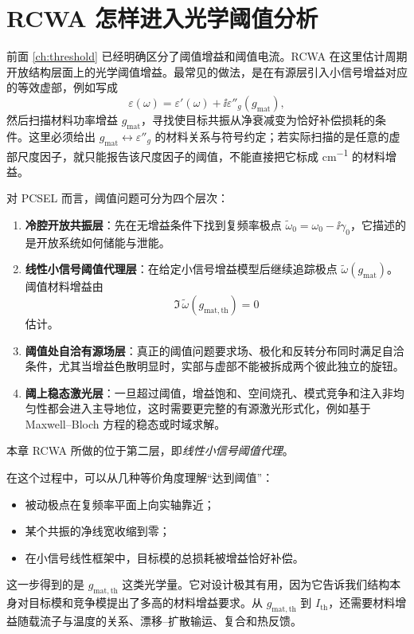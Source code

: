 \section{RCWA 怎样进入光学阈值分析}
前面 \cref{ch:threshold} 已经明确区分了阈值增益和阈值电流。RCWA 在这里估计周期开放结构层面上的光学阈值增益。最常见的做法，是在有源层引入小信号增益对应的等效虚部，例如写成
\begin{equation}
\varepsilon(\omega)
=
\varepsilon'(\omega)+\ii\varepsilon''_g(g_{\mathrm{mat}}),
\label{eq:rcwa_gain_continuation}
\end{equation}
然后扫描材料功率增益 $g_{\mathrm{mat}}$，寻找使目标共振从净衰减变为恰好补偿损耗的条件。这里必须给出 $g_{\mathrm{mat}}\leftrightarrow\varepsilon''_g$ 的材料关系与符号约定；若实际扫描的是任意的虚部尺度因子，就只能报告该尺度因子的阈值，不能直接把它标成 \si{cm^{-1}} 的材料增益。

对 PCSEL 而言，阈值问题可分为四个层次：
\begin{enumerate}
  \item \textbf{冷腔开放共振层}：先在无增益条件下找到复频率极点 $\tilde{\omega}_0=\omega_0-\ii\gamma_0$，它描述的是开放系统如何储能与泄能。
  \item \textbf{线性小信号阈值代理层}：在给定小信号增益模型后继续追踪极点 $\tilde{\omega}(g_{\mathrm{mat}})$。阈值材料增益由
  \[
  \Im\,\tilde{\omega}(g_{\mathrm{mat,th}})=0
  \]
  估计。
  \item \textbf{阈值处自洽有源场层}：真正的阈值问题要求场、极化和反转分布同时满足自洽条件，尤其当增益色散明显时，实部与虚部不能被拆成两个彼此独立的旋钮。
  \item \textbf{阈上稳态激光层}：一旦超过阈值，增益饱和、空间烧孔、模式竞争和注入非均匀性都会进入主导地位，这时需要更完整的有源激光形式化，例如基于 Maxwell--Bloch 方程的稳态或时域求解。
\end{enumerate}

本章 RCWA 所做的位于第二层，即\emph{线性小信号阈值代理}。

在这个过程中，可以从几种等价角度理解“达到阈值”：
\begin{itemize}
  \item 被动极点在复频率平面上向实轴靠近；
  \item 某个共振的净线宽收缩到零；
  \item 在小信号线性框架中，目标模的总损耗被增益恰好补偿。
\end{itemize}

这一步得到的是 $g_{\mathrm{mat,th}}$ 这类光学量。它对设计极其有用，因为它告诉我们结构本身对目标模和竞争模提出了多高的材料增益要求。从 $g_{\mathrm{mat,th}}$ 到 $I_{\mathrm{th}}$，还需要材料增益随载流子与温度的关系、漂移--扩散输运、复合和热反馈。

